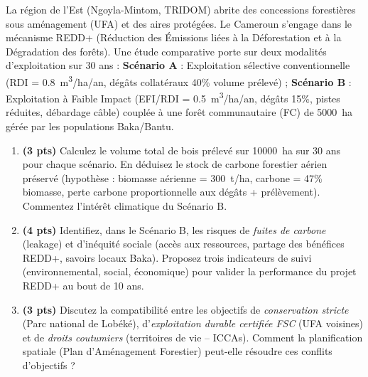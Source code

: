 \documentclass[11pt]{article}
\begin{document}
\begin{exercice}
La région de l'Est (Ngoyla-Mintom, TRIDOM) abrite des concessions forestières sous aménagement (UFA) et des aires protégées. Le Cameroun s'engage dans le mécanisme REDD+ (Réduction des Émissions liées à la Déforestation et à la Dégradation des forêts). Une étude comparative porte sur deux modalités d'exploitation sur 30 ans : \textbf{Scénario A} : Exploitation sélective conventionnelle (RDI = \SI{0,8}{m^3/ha/an}, dégâts collatéraux 40\% volume prélevé) ; \textbf{Scénario B} : Exploitation à Faible Impact (EFI/RDI = \SI{0,5}{m^3/ha/an}, dégâts 15\%, pistes réduites, débardage câble) couplée à une forêt communautaire (FC) de \SI{5000}{ha} gérée par les populations Baka/Bantu.

\begin{enumerate}
    \item \textbf{(3 pts)} Calculez le volume total de bois prélevé sur \SI{10000}{ha} sur 30 ans pour chaque scénario. En déduisez le stock de carbone forestier aérien préservé (hypothèse : biomasse aérienne = \SI{300}{t/ha}, carbone = 47\% biomasse, perte carbone proportionnelle aux dégâts + prélèvement). Commentez l'intérêt climatique du Scénario B.

    \item \textbf{(4 pts)} Identifiez, dans le Scénario B, les risques de \textit{fuites de carbone} (leakage) et d'inéquité sociale (accès aux ressources, partage des bénéfices REDD+, savoirs locaux Baka). Proposez trois indicateurs de suivi (environnemental, social, économique) pour valider la performance du projet REDD+ au bout de 10 ans.

    \item \textbf{(3 pts)} Discutez la compatibilité entre les objectifs de \textit{conservation stricte} (Parc national de Lobéké), d'\textit{exploitation durable certifiée FSC} (UFA voisines) et de \textit{droits coutumiers} (territoires de vie -- ICCAs). Comment la planification spatiale (Plan d'Aménagement Forestier) peut-elle résoudre ces conflits d'objectifs ?
\end{enumerate}
\end{exercice}
\end{document}
